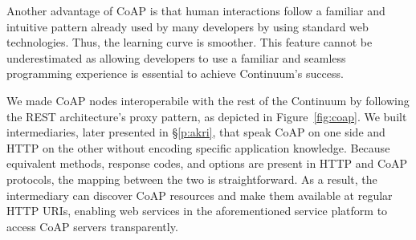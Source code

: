 


Another advantage of CoAP is that human interactions follow a familiar and intuitive pattern already used by many developers by using standard web technologies. Thus, the learning curve is smoother. This feature cannot be underestimated as allowing developers to use a familiar and seamless programming experience is essential to achieve Continuum's success.

We made CoAP nodes interoperabile with the rest of the Continuum by following the REST architecture's proxy pattern, as depicted in Figure~\ref{fig:coap}. We built intermediaries, later presented in §\ref{p:akri}, that speak CoAP on one side and HTTP on the other without encoding specific application knowledge. Because equivalent methods, response codes, and options are present in HTTP and CoAP protocols, the mapping between the two is straightforward. As a result, the intermediary can discover CoAP resources and make them available at regular HTTP URIs, enabling web services in the aforementioned service platform to access CoAP servers transparently.

